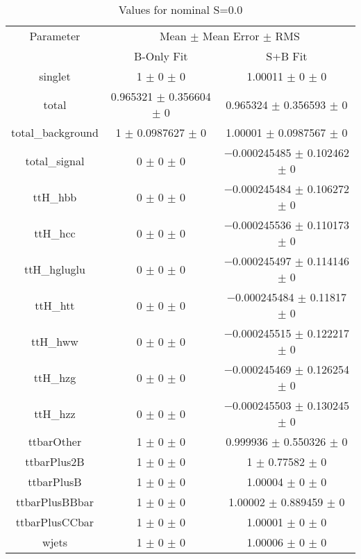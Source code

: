 \begin{table}
\centering
\caption{Values for nominal S=0.0}
\begin{tabular}{ccc}
\toprule
Parameter & \multicolumn{2}{c}{Mean $\pm$ Mean Error $\pm$ RMS}\\
 & B-Only Fit & S+B Fit\\
\midrule
singlet & \num{1} $\pm$ \num{0} $\pm$ \num{0} & \num{1.00011} $\pm$ \num{0} $\pm$ \num{0}\\
total & \num{0.965321} $\pm$ \num{0.356604} $\pm$ \num{0} & \num{0.965324} $\pm$ \num{0.356593} $\pm$ \num{0}\\
total\_background & \num{1} $\pm$ \num{0.0987627} $\pm$ \num{0} & \num{1.00001} $\pm$ \num{0.0987567} $\pm$ \num{0}\\
total\_signal & \num{0} $\pm$ \num{0} $\pm$ \num{0} & \num{-0.000245485} $\pm$ \num{0.102462} $\pm$ \num{0}\\
ttH\_hbb & \num{0} $\pm$ \num{0} $\pm$ \num{0} & \num{-0.000245484} $\pm$ \num{0.106272} $\pm$ \num{0}\\
ttH\_hcc & \num{0} $\pm$ \num{0} $\pm$ \num{0} & \num{-0.000245536} $\pm$ \num{0.110173} $\pm$ \num{0}\\
ttH\_hgluglu & \num{0} $\pm$ \num{0} $\pm$ \num{0} & \num{-0.000245497} $\pm$ \num{0.114146} $\pm$ \num{0}\\
ttH\_htt & \num{0} $\pm$ \num{0} $\pm$ \num{0} & \num{-0.000245484} $\pm$ \num{0.11817} $\pm$ \num{0}\\
ttH\_hww & \num{0} $\pm$ \num{0} $\pm$ \num{0} & \num{-0.000245515} $\pm$ \num{0.122217} $\pm$ \num{0}\\
ttH\_hzg & \num{0} $\pm$ \num{0} $\pm$ \num{0} & \num{-0.000245469} $\pm$ \num{0.126254} $\pm$ \num{0}\\
ttH\_hzz & \num{0} $\pm$ \num{0} $\pm$ \num{0} & \num{-0.000245503} $\pm$ \num{0.130245} $\pm$ \num{0}\\
ttbarOther & \num{1} $\pm$ \num{0} $\pm$ \num{0} & \num{0.999936} $\pm$ \num{0.550326} $\pm$ \num{0}\\
ttbarPlus2B & \num{1} $\pm$ \num{0} $\pm$ \num{0} & \num{1} $\pm$ \num{0.77582} $\pm$ \num{0}\\
ttbarPlusB & \num{1} $\pm$ \num{0} $\pm$ \num{0} & \num{1.00004} $\pm$ \num{0} $\pm$ \num{0}\\
ttbarPlusBBbar & \num{1} $\pm$ \num{0} $\pm$ \num{0} & \num{1.00002} $\pm$ \num{0.889459} $\pm$ \num{0}\\
ttbarPlusCCbar & \num{1} $\pm$ \num{0} $\pm$ \num{0} & \num{1.00001} $\pm$ \num{0} $\pm$ \num{0}\\
wjets & \num{1} $\pm$ \num{0} $\pm$ \num{0} & \num{1.00006} $\pm$ \num{0} $\pm$ \num{0}\\
\bottomrule
\end{tabular}
\end{table}